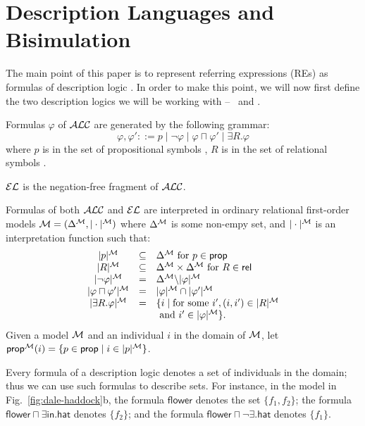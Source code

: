 \section{Description Languages and Bisimulation} \label{sec:bisim}

The main point of this paper is to represent referring expressions
(REs) as formulas of description logic \cite{baad:desc03}.  In order
to make this point, we will now first define the two description
logics we will be working with -- \alc\ and \el.


\begin{definition}
Formulas $\varphi$ of $\mathcal{ALC}$ are generated by the following grammar:
$$
\varphi,\varphi' ::= p \mid \neg \varphi \mid \varphi \sqcap \varphi'
\mid \exists R. \varphi
$$
where $p$ is in the set of propositional symbols \prop, $R$ is in the
set of relational symbols \rel.

$\mathcal{EL}$ is the negation-free fragment of $\mathcal{ALC}$.

Formulas of both $\mathcal{ALC}$ and $\mathcal{EL}$ are interpreted in ordinary
relational first-order models $\mathcal{M} = (\Delta^{\mathcal{M}},|\cdot|^{\mathcal{M}})$ where
$\Delta^{\mathcal{M}}$ is some non-empy set, and $|\cdot|^{\mathcal{M}}$ is an
interpretation function such that:
$$
\begin{array}{ccl}
|p|^{\mathcal{M}} & \subseteq & \Delta^{\mathcal{M}}  \mbox{ for $p \in \textsf{prop}$}\\
|R|^{\mathcal{M}} & \subseteq & \Delta^{\mathcal{M}} \times \Delta^{\mathcal{M}}  \mbox{ for $R \in \textsf{rel}$}\\
|\neg \varphi|^{\mathcal{M}} & = & \Delta^{\mathcal{M}} \backslash |\varphi|^{\mathcal{M}}\\
|\varphi \sqcap \varphi'|^{\mathcal{M}} & = & |\varphi|^{\mathcal{M}} \cap |\varphi'|^{\mathcal{M}}\\
|\exists R.\varphi|^{\mathcal{M}} & = & \{i \mid \mbox{for some } i', (i,i') \in |R|^{\mathcal{M}}\\
& & \mbox{ and } i' \in |\varphi|^{\mathcal{M}} \}.\\
\end{array}
$$
Given a model $\mathcal{M}$ and an individual $i$ in the domain of $\mathcal{M}$, let
$\textsf{prop}^{\mathcal{M}}(i) = \{p \in \textsf{prop} \mid i \in |p|^{\mathcal{M}}\}$.
\end{definition}

Every formula of a description logic denotes a set of individuals in
the domain; thus we can use such formulas to describe sets.  For
instance, in the model in Fig.~\ref{fig:dale-haddock}b, the formula
$\mathsf{flower}$ denotes the set $\{f_1,f_2\}$; the formula
$\mathsf{flower} \sqcap \exists \mathsf{in}.\mathsf{hat}$ denotes
$\{f_2\}$; and the formula $\mathsf{flower} \sqcap \neg
\exists.\mathsf{hat}$ denotes $\{f_1\}$.


